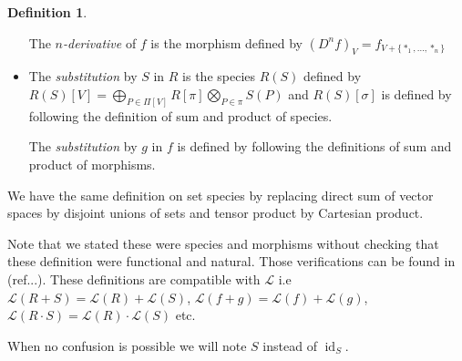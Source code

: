 \documentclass[a4paper]{article}
\DeclareMathOperator{\id}{id}
\theoremstyle{definition}
\newtheorem{definition}{Definition}
\begin{document}
\begin{definition}
\begin{itemize}
The \textit{$n$-derivative} of $f$ is the morphism defined by $(D^nf)_V = f_{V+\{\ast_1,\dots,\ast_n\}}$
\item The \textit{substitution} by $S$ in $R$ is the species $R(S)$ defined by $R(S)[V] = \bigoplus_{P\in\Pi[V]}R[\pi]\bigotimes_{P\in\pi}S(P)$ and $R(S)[\sigma]$ is defined by following the definition of sum and product of species.

The \textit{substitution} by $g$ in $f$ is defined by following the definitions of sum and product of morphisms.
\end{itemize}
We have the same definition on set species by replacing direct sum of vector spaces by disjoint unions of sets and tensor product by Cartesian product.
\end{definition}

Note that we stated these were species and morphisms without checking that these definition were functional and natural. Those verifications can be found in (ref...). These definitions are compatible with $\mathcal{L}$ i.e $\mathcal{L}(R+S) = \mathcal{L}(R)+\mathcal{L}(S)$, $\mathcal{L}(f+g) = \mathcal{L}(f)+\mathcal{L}(g)$, $\mathcal{L}(R\cdot S) = \mathcal{L}(R)\cdot \mathcal{L}(S)$ etc.



When no confusion is possible we will note $S$ instead of $\id_S$.
\end{document}
